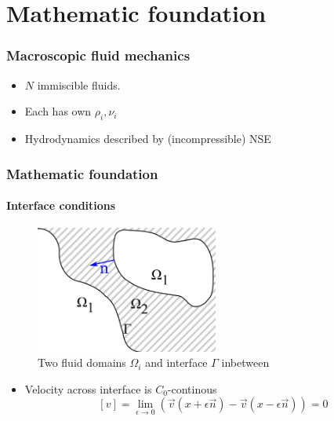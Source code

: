 \documentclass[ucs]{beamer}
\begin{document}
\section{Mathematic foundation}
\begin{frame}
\frametitle{Macroscopic fluid mechanics}

\begin{itemize}
\item<1-> $N$ immiscible fluids.
\item<2-> Each has own $\rho_i, \nu_i$
\item<3-> Hydrodynamics described by (incompressible) NSE
\end{itemize}
\end{frame}

\begin{frame}
\frametitle{Mathematic foundation}
\framesubtitle{Interface conditions}
\begin{figure}[h!]
\includegraphics[width=6cm]{skizze.png}
  \caption{Two fluid domains $\Omega_i$ and interface $\Gamma$ inbetween}
\end{figure}
\begin{itemize}
\item<1-> Velocity across interface is $C_0$-continous 
  $$[v] = \lim_{\epsilon \to 0}(\vec v\left(x+\epsilon \vec n\right) -\vec v(x-\epsilon \vec n))=0$$
\end{itemize}
\end{frame}
\end{document}
